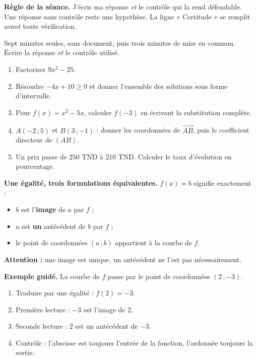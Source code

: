 \documentclass[10pt,a4paper]{article}
\begin{document}
\begin{graybox}\small\textbf{Règle de la séance.} J'écris ma réponse \emph{et} le contrôle qui la rend défendable. Une réponse sans contrôle reste une hypothèse. La ligne « Certitude » se remplit \emph{avant} toute vérification.\end{graybox}
\par\vspace{2mm}
Sept minutes seules, sans document, puis trois minutes de mise en commun. Écrire la réponse \emph{et} le contrôle utilisé.
\begin{enumerate}
\item Factoriser $9x^2 - 25$.
\item Résoudre $-4x + 10 \ge 0$ et donner l'ensemble des solutions sous forme d'intervalle.
\item Pour $f(x)=x^2-5x$, calculer $f(-3)$ en écrivant la substitution complète.
\item $A(-2\,;5)$ et $B(3\,;-1)$ : donner les coordonnées de $\vec{AB}$, puis le coefficient directeur de $(AB)$.
\item Un prix passe de $250$ TND à $210$ TND. Calculer le taux d'évolution en pourcentage.
\end{enumerate}
\certline
\aideline
\needspace{62mm}\par\vspace{3mm}
\begin{methodbox}
\textbf{Une égalité, trois formulations équivalentes.} $f(a) = b$ signifie exactement :
\begin{itemize}
\item $b$ est l'\textbf{image} de $a$ par $f$ ;
\item $a$ est \textbf{un} antécédent de $b$ par $f$ ;
\item le point de coordonnées $(a\,;b)$ appartient à la courbe de $f$.
\end{itemize}
\textbf{Attention :} une image est unique, un antécédent ne l'est pas nécessairement.
\end{methodbox}
\begin{graybox}
\textbf{Exemple guidé.} La courbe de $f$ passe par le point de coordonnées $(2\,;-3)$.
\begin{enumerate}
\item Traduire par une égalité : $f(2) = -3$.
\item Première lecture : $-3$ est l'image de $2$.
\item Seconde lecture : $2$ est un antécédent de $-3$.
\item Contrôle : l'abscisse est toujours l'entrée de la fonction, l'ordonnée toujours la sortie.
\end{enumerate}
\end{graybox}
\end{document}
